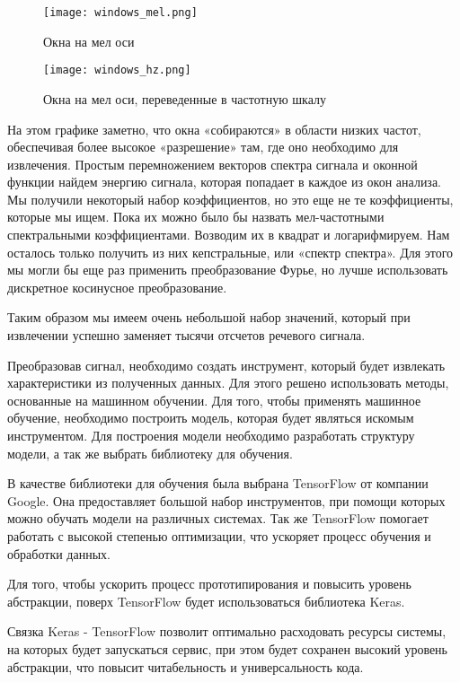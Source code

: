 \begin{figure}
\centering
	\texttt{[image: windows\_mel.png]}
	\caption{Окна на мел оси}
	\label{sec:design:dev:windows}
\end{figure}

\begin{figure}
\centering
	\texttt{[image: windows\_hz.png]}
	\caption{Окна на мел оси, переведенные в частотную шкалу}
	\label{sec:design:dev:windows_mel}
\end{figure}

На этом графике заметно, что окна «собираются» в области низких частот, обеспечивая более высокое «разрешение» там, где оно необходимо для извлечения. Простым перемножением векторов спектра сигнала и оконной функции найдем энергию сигнала, которая попадает в каждое из окон анализа. Мы получили некоторый набор коэффициентов, но это еще не те коэффициенты, которые мы ищем. Пока их можно было бы назвать мел-частотными спектральными коэффициентами. Возводим их в квадрат и логарифмируем. Нам осталось только получить из них кепстральные, или «спектр спектра». Для этого мы могли бы еще раз применить преобразование Фурье, но лучше использовать дискретное косинусное преобразование.

Таким образом мы имеем очень небольшой набор значений, который при извлечении успешно заменяет тысячи отсчетов речевого сигнала.

Преобразовав сигнал, необходимо создать инструмент, который будет извлекать характеристики из полученных данных. Для этого решено использовать методы, основанные на машинном обучении. Для того, чтобы применять машинное обучение, необходимо построить модель, которая будет являться искомым инструментом. Для построения модели необходимо разработать структуру модели, а так же выбрать библиотеку для обучения.

В качестве библиотеки для обучения была выбрана TensorFlow от компании Google. Она предоставляет большой набор инструментов, при помощи которых можно обучать модели на различных системах. Так же TensorFlow помогает работать с высокой степенью оптимизации, что ускоряет процесс обучения и обработки данных.

Для того, чтобы ускорить процесс прототипирования и повысить уровень абстракции, поверх TensorFlow будет использоваться библиотека Keras.

Связка Keras - TensorFlow позволит оптимально расходовать ресурсы системы, на которых будет запускаться сервис, при этом будет сохранен высокий уровень абстракции, что повысит читабельность и универсальность кода.

